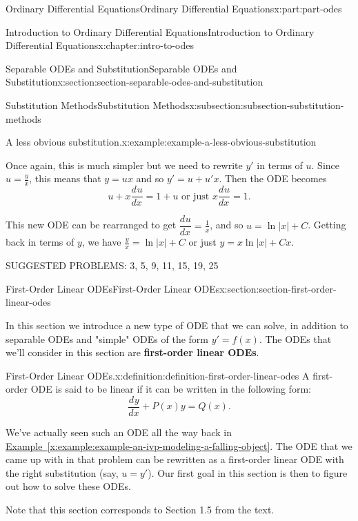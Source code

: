\documentclass[twoside,10pt,]{book}
\newcommand{\xreffont}{\relax}
\newcommand{\terminology}[1]{\textbf{#1}}
\numberwithin{equation}{part}
\providecommand{\dv}[3][]{\dfrac{d^{#1} #2}{d #3^{#1}}}
\begin{document}
\begin{partptx}{Ordinary Differential Equations}{}{Ordinary Differential Equations}{}{}{x:part:part-odes}
\begin{chapterptx}{Introduction to Ordinary Differential Equations}{}{Introduction to Ordinary Differential Equations}{}{}{x:chapter:intro-to-odes}
\begin{sectionptx}{Separable ODEs and Substitution}{}{Separable ODEs and Substitution}{}{}{x:section:section-separable-odes-and-substitution}
\begin{subsectionptx}{Substitution Methods}{}{Substitution Methods}{}{}{x:subsection:subsection-substitution-methods}
\begin{example}{A less obvious substitution.}{x:example:example-a-less-obvious-substitution}
\par
Once again, this is much simpler but we need to rewrite \(y'\) in terms of \(u\). Since \(u=\frac{y}{x}\), this means that \(y=ux\) and so \(y' = u+u'x\). Then the ODE becomes%
\begin{equation*}
u+x\dv{u}{x} = 1+u\text{ or just } x\dv{u}{x} = 1\text{.}
\end{equation*}
%
\par
This new ODE can be rearranged to get \(\dv{u}{x} = \frac{1}{x}\), and so \(u = \ln|x|+C\). Getting back in terms of \(y\), we have \(\frac{y}{x} = \ln|x|+C\) or just \(y = x\ln|x|+Cx\).%
\end{example}
\end{subsectionptx}
\begin{conclusion}{}%
SUGGESTED PROBLEMS: 3, 5, 9, 11, 15, 19, 25%
\end{conclusion}%
\end{sectionptx}
%
%
\typeout{************************************************}
\typeout{************************************************}
%
\begin{sectionptx}{First-Order Linear ODEs}{}{First-Order Linear ODEs}{}{}{x:section:section-first-order-linear-odes}
\begin{introduction}{}%
In this section we introduce a new type of ODE that we can solve, in addition to separable ODEs and "simple" ODEs of the form \(y'=f(x)\). The ODEs that we'll consider in this section are \terminology{first-order linear ODEs}.%
\begin{definition}{First-Order Linear ODEs.}{x:definition:definition-first-order-linear-odes}%
%
A first-order ODE is said to be linear if it can be written in the following form:%
\begin{equation*}
\dv{y}{x} + P(x)y = Q(x).
\end{equation*}
%
\end{definition}
We've actually seen such an ODE all the way back in \hyperref[x:example:example-an-ivp-modeling-a-falling-object]{Example~{\xreffont\ref{x:example:example-an-ivp-modeling-a-falling-object}}}. The ODE that we came up with in that problem can be rewritten as a first-order linear ODE with the right substitution (say, \(u = y'\)). Our first goal in this section is then to figure out how to solve these ODEs.%
\par
Note that this section corresponds to Section 1.5 from the text.%
\end{introduction}%

\end{sectionptx}
\end{chapterptx}
\end{partptx}
\end{document}
